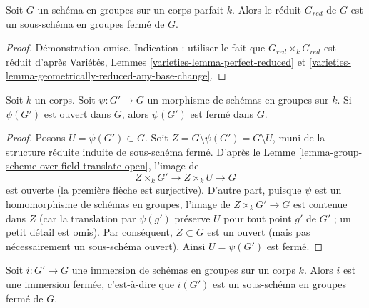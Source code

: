 \begin{lemma}
\label{lemma-reduced-subgroup-scheme-perfect}
Soit $G$ un schéma en groupes sur un corps parfait $k$.
Alors le réduit $G_{red}$ de $G$ est un sous-schéma en groupes fermé de $G$.
\end{lemma}

\begin{proof}
Démonstration omise. Indication : utiliser le fait que $G_{red} \times_k G_{red}$ est réduit d'après
Variétés, Lemmes \ref{varieties-lemma-perfect-reduced} et
\ref{varieties-lemma-geometrically-reduced-any-base-change}.
\end{proof}

\begin{lemma}
\label{lemma-open-subgroup-closed-over-field}
Soit $k$ un corps. Soit $\psi : G' \to G$ un morphisme de schémas en groupes
sur $k$. Si $\psi(G')$ est ouvert dans $G$, alors $\psi(G')$ est fermé dans $G$.
\end{lemma}

\begin{proof}
Posons $U = \psi(G') \subset G$. Soit $Z = G \setminus \psi(G') = G \setminus U$,
muni de la structure réduite induite de sous-schéma fermé. D'après
le Lemme \ref{lemma-group-scheme-over-field-translate-open},
l'image de
$$
Z \times_k G' \longrightarrow
Z \times_k U \longrightarrow G
$$
est ouverte (la première flèche est surjective). D'autre part, puisque $\psi$
est un homomorphisme de schémas en groupes, l'image de $Z \times_k G' \to G$
est contenue dans $Z$ (car la translation par $\psi(g')$ préserve
$U$ pour tout point $g'$ de $G'$ ; un petit détail est omis).
Par conséquent, $Z \subset G$ est un ouvert (mais pas
nécessairement un sous-schéma ouvert). Ainsi $U = \psi(G')$ est fermé.
\end{proof}

\begin{lemma}
\label{lemma-immersion-group-schemes-closed-over-field}
Soit $i : G' \to G$ une immersion de schémas en groupes sur un corps $k$.
Alors $i$ est une immersion fermée, c'est-à-dire que $i(G')$ est un sous-schéma en groupes fermé
de $G$.
\end{lemma}

